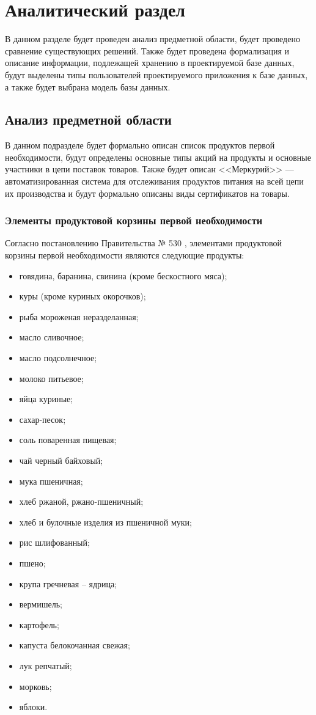\chapter{\label{analysis}Аналитический раздел}

В данном разделе будет проведен анализ предметной области, будет проведено сравнение существующих решений. 
Также будет проведена формализация и описание информации, подлежащей хранению в проектируемой базе данных, будут выделены типы пользователей проектируемого приложения к базе данных, а также будет выбрана модель базы данных.

\section{Анализ предметной области}

В данном подразделе будет формально описан список продуктов первой необходимости, будут определены основные типы акций на продукты и основные участники в цепи поставок товаров. Также будет описан <<Меркурий>> --- автоматизированная система для отслеживания продуктов питания на всей цепи их производства и будут формально описаны виды сертификатов на товары.

\subsection{Элементы продуктовой корзины первой необходимости}

Согласно постановлению Правительства № 530 \cite{info_essential_goods2}, элементами продуктовой корзины первой необходимости являются следующие продукты:

\begin{itemize}[label=--]
	\item говядина, баранина, свинина (кроме бескостного мяса);
	\item куры (кроме куриных окорочков);
	\item рыба мороженая неразделанная;
	\item масло сливочное;
	\item масло подсолнечное;
	\item молоко питьевое;
	\item яйца куриные;
	\item сахар-песок;
	\item соль поваренная пищевая;
	\item чай черный байховый;
	\item мука пшеничная;
	\item хлеб ржаной, ржано-пшеничный;
	\item хлеб и булочные изделия из пшеничной муки;
	\item рис шлифованный;
	\item пшено;
	\item крупа гречневая -- ядрица;
	\item вермишель;
	\item картофель;
	\item капуста белокочанная свежая;
	\item лук репчатый;
	\item морковь;
	\item яблоки.
\end{itemize}

